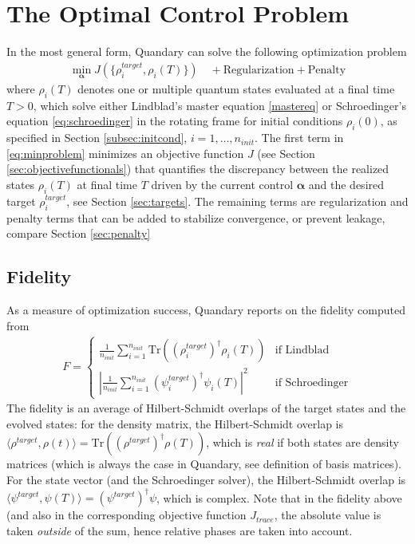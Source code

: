 \documentclass[11pt]{article}
\newcommand{\bfa}{\boldsymbol{\alpha}}
\begin{document}
\section{The Optimal Control Problem} \label{sec:optim}
In the most general form, Quandary can solve the following optimization problem
\begin{align}\label{eq:minproblem}
  \min_{\boldsymbol{\alpha}} J(\{\rho^{target}_i, \rho_i(T) \}) \quad + \mbox{Regularization} + \mbox{Penalty}
\end{align}
where $\rho_i(T)$ denotes one or multiple quantum states evaluated at a final time $T>0$, which solve either Lindblad's master equation \eqref{mastereq} or Schroedinger's equation \eqref{eq:schroedinger} in the rotating frame for initial conditions $\rho_i(0)$, as specified in Section \ref{subsec:initcond}, $i=1,\dots, n_{init}$. The first term in \eqref{eq:minproblem} minimizes an objective function $J$ (see Section \ref{sec:objectivefunctionals}) that quantifies the discrepancy between the realized states $\rho_i(T)$ at final time $T$ driven by the current control $\boldsymbol{\alpha}$ and the desired target $\rho^{target}_i$, see Section \ref{sec:targets}. 
The remaining terms are regularization and penalty terms that can be added to stabilize convergence, or prevent leakage, compare Section \ref{sec:penalty}

\subsection{Fidelity}\label{sec:fidelity}

As a measure of optimization success, Quandary reports on the fidelity computed from 
\begin{align}\label{eq:fidelity}
  F = \begin{cases}
    \frac{1}{n_{init}} \sum_{i=1}^{n_{init}} \mbox{Tr}\left(\left(\rho^{target}_i\right)^\dagger\rho_i(T) \right) & \text{if Lindblad} \\
    \left|\frac{1}{n_{init}} \sum_{i=1}^{n_{init}} (\psi^{target}_i)^\dagger \psi_i(T) \right|^2 & \text{if Schroedinger}
  \end{cases}
\end{align}
The fidelity is an average of Hilbert-Schmidt overlaps of the target states and the evolved states: for the density matrix, the Hilbert-Schmidt overlap is $\langle \rho^{target}, \rho(t)\rangle = \mbox{Tr}\left(\left(\rho^{target}\right)^\dagger\rho(T)\right)$, which is \textit{real} if both states are density matrices (which is always the case in Quandary, see definition of basis matrices). For the state vector (and the Schroedinger solver), the Hilbert-Schmidt overlap is $\langle \psi^{target}, \psi(T)\rangle = (\psi^{target})^{\dagger}\psi $, which is complex. Note that in the fidelity above (and also in the corresponding objective function $J_{trace}$, the absolute value is taken \textit{outside} of the sum, hence relative phases are taken into account. 
\end{document}
